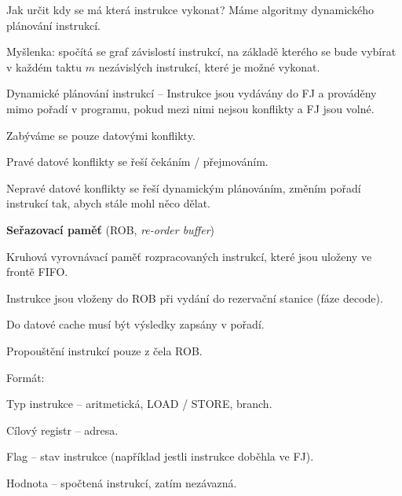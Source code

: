\begin{compactitem}
    \item Jak určit kdy se má která instrukce vykonat? Máme algoritmy dynamického plánování instrukcí.

    \item Myšlenka: spočítá se graf závislostí instrukcí, na základě kterého se bude vybírat v každém taktu $m$ nezávislých instrukcí, které je možné vykonat.

    \item Dynamické plánování instrukcí -- Instrukce jsou vydávány do FJ a prováděny mimo pořadí v programu, pokud mezi nimi nejsou konflikty a FJ jsou volné.

    \item Zabýváme se pouze datovými konflikty. \begin{compactitem}
        \item Pravé datové konflikty se řeší čekáním / přejmováním.
        \item Nepravé datové konflikty se řeší dynamickým plánováním, změním pořadí instrukcí tak, abych stále mohl něco dělat.
    \end{compactitem}

    \item \textbf{Seřazovací paměť} (ROB, \textit{re-order buffer}) \begin{compactitem}
        \item Kruhová vyrovnávací paměť rozpracovaných instrukcí, které jsou uloženy ve frontě FIFO.
        \item Instrukce jsou vloženy do ROB při vydání do rezervační stanice (fáze decode).
        \item Do datové cache musí být výsledky zapsány v pořadí.
        \item Propouštění instrukcí pouze z čela ROB.
        \item Formát: \begin{compactitem}
            \item Typ instrukce -- aritmetická, LOAD / STORE, branch.
            \item Cílový registr -- adresa.
            \item Flag -- stav instrukce (například jestli instrukce doběhla ve FJ).
            \item Hodnota -- spočtená instrukcí, zatím nezávazná.
        \end{compactitem}
    \end{compactitem}
\end{compactitem}


